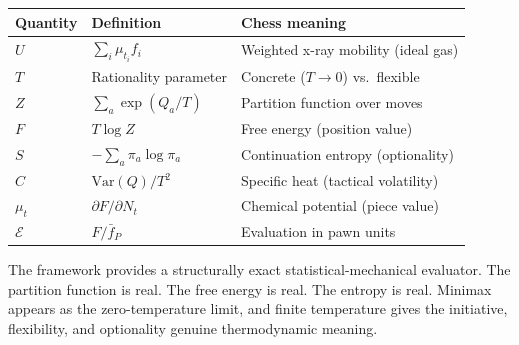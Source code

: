 \documentclass[11pt,a4paper]{article}
\begin{document}
\begin{center}
\renewcommand{\arraystretch}{1.3}
\begin{tabular}{@{}lll@{}}
\toprule
\textbf{Quantity} & \textbf{Definition} & \textbf{Chess meaning} \\
\midrule
$U$ & $\sum_i \mu_{t_i} f_i$ & Weighted x-ray mobility (ideal gas) \\
$T$ & Rationality parameter & Concrete ($T \to 0$) vs.\ flexible \\
$Z$ & $\sum_a \exp(Q_a / T)$ & Partition function over moves \\
$F$ & $T \log Z$ & Free energy (position value) \\
$S$ & $-\sum_a \pi_a \log \pi_a$ & Continuation entropy (optionality) \\
$C$ & $\text{Var}(Q) / T^2$ & Specific heat (tactical volatility) \\
$\mu_t$ & $\partial F / \partial N_t$ & Chemical potential (piece value) \\
$\mathcal{E}$ & $F / \bar{f}_P$ & Evaluation in pawn units \\
\bottomrule
\end{tabular}
\end{center}

The framework provides a structurally exact statistical-mechanical
evaluator. The partition function is real. The free energy is real. The
entropy is real. Minimax appears as the zero-temperature limit, and finite
temperature gives the initiative, flexibility, and optionality genuine
thermodynamic meaning.
\end{document}
